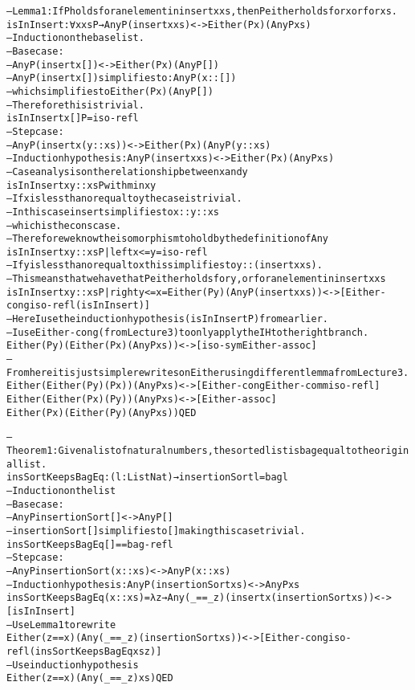 \documentclass[oribibl, fleqn]{llncs}
\newenvironment{changemargin}[2]{%
\begin{list}{}{%
\setlength{\topsep}{0pt}%
\setlength{\leftmargin}{#1}%
\setlength{\rightmargin}{#2}%
\setlength{\listparindent}{\parindent}%
\setlength{\itemindent}{\parindent}%
\setlength{\parsep}{\parskip}%
}%
\item[]}{\end{list}}
\begin{document}
\begin{changemargin}{-2.5cm}{-2.5cm}
\begin{alltt}
-- Lemma 1: If P holds for an element in insert x xs, then P either holds for x or for xs.
isInInsert : ∀ {x xs P} → Any P (insert x xs) <-> Either (P x) (Any P xs)
-- Induction on the base list.
-- Base case:
-- Any P (insert x []) <-> Either (P x) (Any P [])
-- Any P (insert x []) simplifies to: Any P (x :: [])
-- which simplifies to Either (P x) (Any P [])
-- Therefore this is trivial.
isInInsert {x} {[]} {P} = iso-refl
-- Step case: 
-- Any P (insert x (y :: xs)) <-> Either (P x) (Any P (y :: xs)
-- Induction hypothesis: Any P (insert x xs) <-> Either (P x) (Any P xs)
-- Case analysis on the relationship between x and y
isInInsert {x} {y :: xs} {P} with min x y 
-- If x is less than or equal to y the case is trivial.
-- In this case insert simplifies to x :: y :: xs
-- which is the cons case.
-- Therefore we know the isomorphism to hold by the definition of Any
isInInsert {x} {y :: xs} {P} | left x<=y  = iso-refl
-- If y is less than or equal to x this simplifies to y :: (insert x xs).
-- This means that we have that P either holds for y, or for an element in insert x xs
isInInsert {x} {y :: xs} {P} | right y<=x = Either (P y)                (Any P (insert x xs))     <->[ Either-cong iso-refl (isInInsert) ]
-- Here I use the induction hypothesis (isInInsert P) from earlier.
-- I use Either-cong (from Lecture 3) to only apply the IH to the right branch. 
                                            Either (P y)                (Either (P x) (Any P xs)) <->[ iso-sym Either-assoc ] 
-- From here it is just simple rewrites on Either using different lemma from Lecture 3.
                                            Either (Either (P y) (P x)) (Any P xs)                <->[ Either-cong Either-comm iso-refl ]
                                            Either (Either (P x) (P y)) (Any P xs)                <->[ Either-assoc ] 
                                            Either (P x)                (Either (P y) (Any P xs)) QED

-- Theorem 1: Given a list of natural numbers, the sorted list is bag equal to the original list. 
insSortKeepsBagEq : (l : List Nat) → insertionSort l =bag l 
-- Induction on the list
-- Base case:
-- Any P insertionSort [] <-> Any P []
-- insertionSort [] simplifies to [] making this case trivial.
insSortKeepsBagEq [] = =bag-refl
-- Step case:
-- Any P insertionSort (x :: xs) <-> Any P (x :: xs)
-- Induction hypothesis: Any P (insertionSort xs) <-> Any P xs 
insSortKeepsBagEq (x :: xs) = λ z → Any (_==_ z) (insert x (insertionSort xs)) <->[ isInInsert ]
-- Use Lemma 1 to rewrite
                                    Either (z == x) (Any (_==_ z) (insertionSort xs)) <->[ Either-cong iso-refl (insSortKeepsBagEq xs z) ]
-- Use induction hypothesis
                                    Either (z == x) (Any (_==_ z) xs) QED


\end{alltt}
\end{changemargin}
\end{document}
